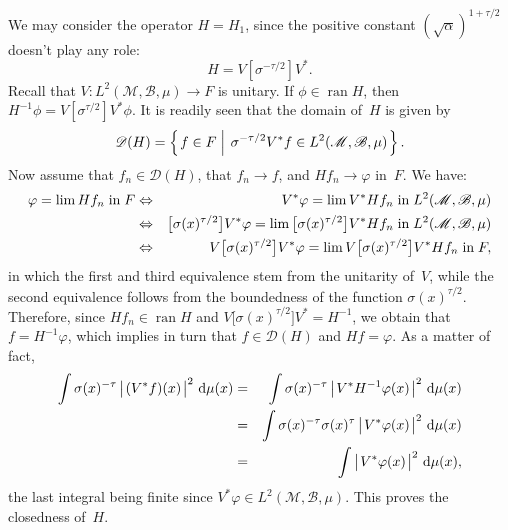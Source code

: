 \documentclass[a4paper]{article}
\def\B{\mathscr{B}}
\def\D{\mathscr{D}}
\def\M{\mathscr{M}}
\def\ran#1{\mathop{\mathrm{ran}}#1}
\def\ud{\,\mathrm{d}}
\def\vphan{\vphantom{\bigl|}}
\def\setc#1#2{
    \left\{
    \mskip 2mu #1 \mskip 2mu
    \left| \vphan\vphantom{#1#2} \right.
    \mskip 2mu #2 \mskip 2mu
    \right\}
    }
\def\modc#1{
    \left|
    \mskip 2mu #1 \vphan \mskip 2mu
    \right|
    }
\begin{document}
We may consider the operator $H=H_1$, since the positive
constant $(\sqrt{\alpha})^{1+\tau/2}$ doesn't play any role:
$$
H=V\left[\sigma^{-\tau/2}\right]V^*.
$$
Recall that $V\colon L^2(\M,\B,\mu)\to F$ is unitary.
If $\phi\in\ran H$, then
$H^{-1}\phi=V\left[\sigma^{\tau/2}\right]V^*\phi$.
It is readily seen that the domain of~$H$ is given by
$$
\D(H)=\setc{f\in F}{\sigma^{-\tau/2}V^*f\in L^2(\M,\B,\mu)}.
$$
Now assume that $f_n\in\D(H)$, that $f_n\to f$,
and $Hf_n\to\varphi$ in~$F$. We have:
\begin{eqnarray*}
\varphi=\lim Hf_n\;\hbox{in}\;F
&\Leftrightarrow&
V^*\varphi=\lim V^*Hf_n\;\hbox{in}\;L^2(\M,\B,\mu)\\
&\Leftrightarrow&
\big[\sigma(x)^{\tau/2}\big]V^*\varphi=
\lim \big[\sigma(x)^{\tau/2}\big]V^*Hf_n\;\hbox{in}\;L^2(\M,\B,\mu)\\
&\Leftrightarrow&
V\big[\sigma(x)^{\tau/2}\big]V^*\varphi=
\lim V\big[\sigma(x)^{\tau/2}\big]V^*Hf_n\;\hbox{in}\;F,
\end{eqnarray*}
in which the first and third equivalence stem
from the unitarity of~$V$,
while the second equivalence follows from the boundedness
of the function $\sigma(x)^{\tau/2}$.
Therefore, since $Hf_n\in\ran H$ and
$V\big[\sigma(x)^{\tau/2}\big]V^*=H^{-1}$, we obtain that
$f=H^{-1}\varphi$, which implies in turn that $f\in\D(H)$
and $Hf=\varphi$.
As a matter of fact,
\begin{eqnarray*}
\int\sigma(x)^{-\tau}\modc{(V^*f)(x)}^2\ud\mu(x)
&=&
\int\sigma(x)^{-\tau}\modc{V^*H^{-1}\varphi(x)}^2\ud\mu(x)\\
&=&
\int\sigma(x)^{-\tau}\sigma(x)^{\tau}
\modc{V^*\varphi(x)}^2\ud\mu(x)\\
&=&
\int\modc{V^*\varphi(x)}^2\ud\mu(x),
\end{eqnarray*}
the last integral being finite since
$V^*\varphi\in L^2(\M,\B,\mu)$.
This proves the closedness of~$H$.




\end{document}

